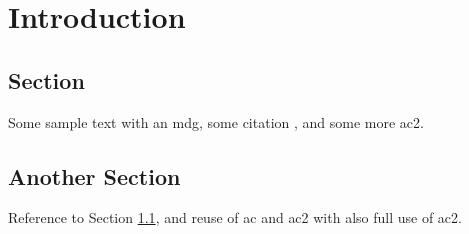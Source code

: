 \chapter{Introduction}
\label{chap:intro}

\section{Section} \label{sec:s1}
Some sample text with an \ac{mdg}, some citation \cite{citeKey1}, and some more \ac{ac2}.

\section{Another Section}
Reference to Section \ref{sec:s1}, and reuse of \ac{ac} and \ac{ac2} with also full use of \acf{ac2}.
